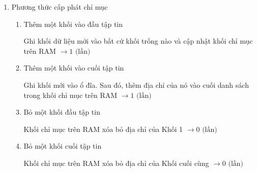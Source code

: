 \documentclass[12pt, letterpaper]{article}
\begin{document}
\begin{enumerate}
\begin{enumerate}[label=\alph*)]
                Chỉ cần đổi con trỏ đầu sang khối kế tiếp nên không cần truy cập dữ liệu trên đĩa $\rightarrow 0 \text{ (lần)} $
                \item Bỏ một khối cuối tập tin
                
                Đọc 99 khối để tìm khối áp cuối, ghi khối cuối (-1) $\rightarrow 99 + 1 = 100 \text{ (lần)} $
            \end{enumerate}
    \item Phương thức cấp phát chỉ mục
            \begin{enumerate}[label=\alph*)]
                \item Thêm một khối vào đầu tập tin
                
                Ghi khối dữ liệu mới vào bất cứ khối trống nào và cập nhật khối chỉ mục trên RAM $\rightarrow 1 \text{ (lần)}$
                \item Thêm một khối vào cuối tập tin 
                
                Ghi khối mới vào ổ đĩa. Sau đó, thêm địa chỉ của nó vào cuối danh sách trong khối chỉ mục trên RAM $\rightarrow 1 \text{ (lần)}$
                \item Bỏ một khối đầu tập tin
                
                Khối chỉ mục trên RAM xóa bỏ địa chỉ của Khối 1 $\rightarrow 0 \text{ (lần)}$
                \item Bỏ một khối cuối tập tin
                
                Khối chỉ mục trên RAM xóa bỏ địa chỉ của Khối cuối cùng $\rightarrow 0 \text{ (lần)}$
            \end{enumerate}
\end{enumerate}
\end{document}
